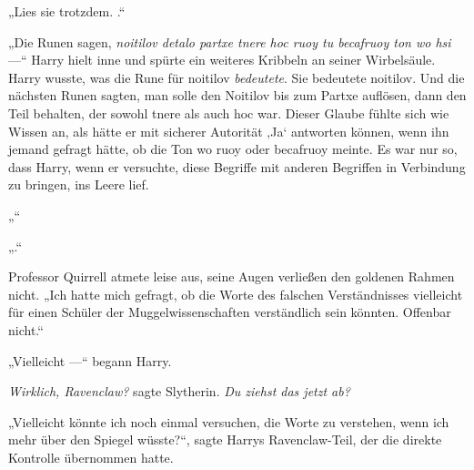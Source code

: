„Lies sie trotzdem. .“

„Die Runen sagen, \emph{noitilov detalo partxe tnere hoc ruoy tu becafruoy ton wo hsi} —“ Harry hielt inne und spürte ein weiteres Kribbeln an seiner Wirbelsäule.
Harry wusste, was die Rune für noitilov \emph{bedeutete}. Sie bedeutete noitilov. Und die nächsten Runen sagten, man solle den Noitilov bis zum Partxe auflösen, dann den Teil behalten, der sowohl tnere als auch hoc war. Dieser Glaube fühlte sich wie Wissen an, als hätte er mit sicherer Autorität ‚Ja‘ antworten können, wenn ihn jemand gefragt hätte, ob die Ton wo ruoy oder becafruoy meinte. Es war nur so, dass Harry, wenn er versuchte, diese Begriffe mit anderen Begriffen in Verbindung zu bringen, ins Leere lief.

„“

„.“

Professor Quirrell atmete leise aus, seine Augen verließen den goldenen Rahmen nicht.
„Ich hatte mich gefragt, ob die Worte des falschen Verständnisses vielleicht für einen Schüler der Muggelwissenschaften verständlich sein könnten. Offenbar nicht.“

„Vielleicht —“ begann Harry.

\emph{Wirklich, Ravenclaw?} sagte Slytherin. \emph{Du ziehst das \emph{jetzt} ab?}

„Vielleicht könnte ich noch einmal versuchen, die Worte zu verstehen, wenn ich mehr über den Spiegel wüsste?“, sagte Harrys Ravenclaw-Teil, der die direkte Kontrolle übernommen hatte.


